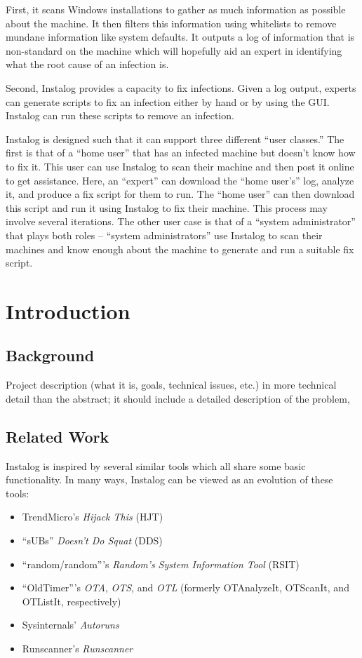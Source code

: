 \documentclass[letterpaper,12pt]{article}
\begin{document}
First, it scans Windows installations to gather as much information as possible
about the machine.  It then filters this information using whitelists to remove
mundane information like system defaults.  It outputs a log of information that
is non-standard on the machine which will hopefully aid an expert in identifying
what the root cause of an infection is.

Second, Instalog provides a capacity to fix infections.  Given a log output,
experts can generate scripts to fix an infection either by hand or by using the
GUI.  Instalog can run these scripts to remove an infection.  

Instalog is designed such that it can support three different ``user classes.'' 
The first is that of a ``home user'' that has an infected machine but doesn't
know how to fix it.  This user can use Instalog to scan their machine and then
post it online to get assistance.  Here, an ``expert'' can download the ``home
user's'' log, analyze it, and produce a fix script for them to run.  The ``home
user'' can then download this script and run it using Instalog to fix their
machine.  This process may involve several iterations.  The other user case is
that of a ``system administrator'' that plays both roles -- ``system
administrators'' use Instalog to scan their machines and know enough about the
machine to generate and run a suitable fix script.  

\newpage



\section{Introduction} \label{introduction}
\subsection{Background}
Project description (what it is, goals, technical issues, etc.) in more
technical detail than the abstract; it should include a detailed description of
the problem,

\subsection{Related Work}
Instalog is inspired by several similar tools which all share some basic
functionality.  In many ways, Instalog can be viewed as an evolution of
these tools:

\begin{itemize}
    \item TrendMicro's {\em Hijack This} (HJT)
    \item ``sUBs'' {\em Doesn't Do Squat} (DDS)
    \item ``random/random'''s {\em Random's System Information Tool} (RSIT)
    \item ``OldTimer'''s {\em OTA}, {\em OTS}, and {\em OTL} (formerly
    OTAnalyzeIt, OTScanIt, and OTListIt, respectively)
    \item Sysinternals' {\em Autoruns}
    \item Runscanner's {\em Runscanner}
\end{itemize}
\end{document}
